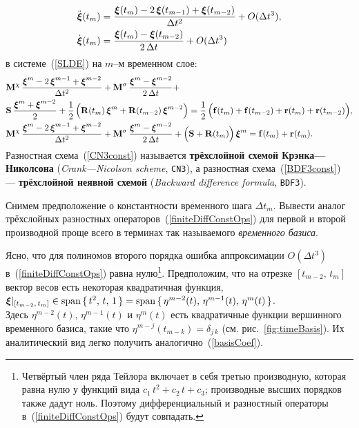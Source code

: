\begin{subequations}
\label{finiteDiffConstOps}
	\begin{align}
		\ddot{\boldsymbol{\mathbf{\xi}}}(t_m) &= \frac{\boldsymbol{\mathbf{\xi}}(t_m) - 2 \, \boldsymbol{\mathbf{\xi}}(t_{m-1}) + \boldsymbol{\mathbf{\xi}}(t_{m-2})}{\Delta t^2} + O(\Delta t^3), 
		\\
		\dot{\boldsymbol{\mathbf{\xi}}}(t_m) &= \frac{\boldsymbol{\mathbf{\xi}}(t_m) - \boldsymbol{\mathbf{\xi}}(t_{m-2})}{2 \, \Delta t} + O(\Delta t^3)
	\end{align}
\end{subequations}
в системе~(\ref{SLDE}) на $m$--м временном слое:
\begin{subequations}
\label{finiteDiffConstConst}
	\begin{align}
		&
		\boldsymbol{\mathbf{M}}^\chi \, \frac{\boldsymbol{\mathbf{\xi}}^m - 2 \, \boldsymbol{\mathbf{\xi}}^{m-1} + \boldsymbol{\mathbf{\xi}}^{m-2}}{\Delta t^2} +
		\boldsymbol{\mathbf{M}}^\sigma \, \frac{\boldsymbol{\mathbf{\xi}}^m - \boldsymbol{\mathbf{\xi}}^{m-2}}{2 \, \Delta t} + \nonumber \\ 
		&
		\boldsymbol{\mathbf{S}} \, \frac{\boldsymbol{\mathbf{\xi}}^m + \boldsymbol{\mathbf{\xi}}^{m-2}}{2} +
		\frac{1}{2} \, \Big( \boldsymbol{\mathbf{R}}(t_m) \, \boldsymbol{\mathbf{\xi}}^m + \boldsymbol{\mathbf{R}}(t_{m-2}) \, \boldsymbol{\mathbf{\xi}}^{m-2} \Big)
		= 
		\frac{1}{2} \, \Big( \boldsymbol{\mathbf{f}}(t_m) + \boldsymbol{\mathbf{f}}(t_{m-2}) + \boldsymbol{\mathbf{r}}(t_m) + \boldsymbol{\mathbf{r}}(t_{m-2}) \Big), \label{CN3const} \\
		&
		\boldsymbol{\mathbf{M}}^\chi \, \frac{\boldsymbol{\mathbf{\xi}}^m - 2 \, \boldsymbol{\mathbf{\xi}}^{m-1} + \boldsymbol{\mathbf{\xi}}^{m-2}}{\Delta t^2} +
		\boldsymbol{\mathbf{M}}^\sigma \, \frac{\boldsymbol{\mathbf{\xi}}^m - \boldsymbol{\mathbf{\xi}}^{m-2}}{2 \, \Delta t} + 
		\Big( \boldsymbol{\mathbf{S}} + \boldsymbol{\mathbf{R}}(t_m) \Big) \, \boldsymbol{\mathbf{\xi}}^m
		= 
		\boldsymbol{\mathbf{f}}(t_m) + \boldsymbol{\mathbf{r}}(t_m). \label{BDF3const}
	\end{align}
\end{subequations}
Разностная схема~(\ref{CN3const}) называется \textbf{трёхслойной схемой Крэнка---Николсона} (\textit{Crank---Nicolson scheme}, \texttt{CN3}), а разностная схема~(\ref{BDF3const}) --- \textbf{трёхслойной неявной схемой} (\textit{Backward difference formula}, \texttt{BDF3}).  

Снимем предположение о константности временного шага $\Delta t_m$. Вывести аналог трёхслойных разностных операторов~(\ref{finiteDiffConstOps}) для первой и второй производной проще всего в терминах так называемого \textit{временного базиса}.

Ясно, что для полиномов второго порядка ошибка аппроксимации $O(\Delta t^3)$ в~(\ref{finiteDiffConstOps}) равна нулю\footnote{
	Четвёртый член ряда Тейлора включает в себя третью производную, которая равна нулю у функций вида $c_1 \, t^2 + c_2 \, t + c_3$; производные высших порядков также дадут ноль. Поэтому дифференциальный и разностный операторы в~(\ref{finiteDiffConstOps}) будут совпадать.
}. Предположим, что на отрезке $\left[ t_{m-2}, \, t_{m} \right]$ вектор весов есть некоторая квадратичная функция, $\boldsymbol{\mathbf{\xi}}|_{\left[ t_{m-2}, \, t_{m} \right]} \in \operatorname{span} \, \{ \, t^2, \, t, \, 1 \, \} = \operatorname{span} \, \{ \, \eta^{m-2}(t), \, \eta^{m-1}(t), \, \eta^{m}(t) \, \}$. \\ 
Здесь $\eta^{m-2}(t)$, $\eta^{m-1}(t)$ и $\eta^{m}(t)$ есть квадратичные функции вершинного временного базиса, такие что $\eta^{m-j}(t_{m-k}) = \delta_{j \, k}$ (см. рис.~\ref{fig:timeBasis}). Их аналитический вид легко получить аналогично~(\ref{basisCoef}).

